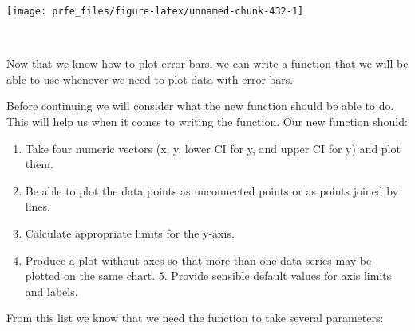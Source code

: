 \documentclass[12pt,a4paper]{book}
\theoremstyle{definition}
\theoremstyle{definition}
\theoremstyle{definition}
\theoremstyle{remark}
\begin{document}
\begin{center}\texttt{[image: prfe\_files/figure-latex/unnamed-chunk-432-1]} \end{center}

~

Now that we know how to plot error bars, we can write a function that we
will be able to use whenever we need to plot data with error bars.

Before continuing we will consider what the new function should be able
to do. This will help us when it comes to writing the function. Our new
function should:

\begin{enumerate}
\def\labelenumi{\arabic{enumi}.}
\item
  Take four numeric vectors (x, y, lower CI for y, and upper CI for y)
  and plot them.
\item
  Be able to plot the data points as unconnected points or as points
  joined by lines.
\item
  Calculate appropriate limits for the y-axis.
\item
  Produce a plot without axes so that more than one data series may be
  plotted on the same chart. 5. Provide sensible default values for axis
  limits and labels.
\end{enumerate}

From this list we know that we need the function to take several
parameters:

~
\end{document}
